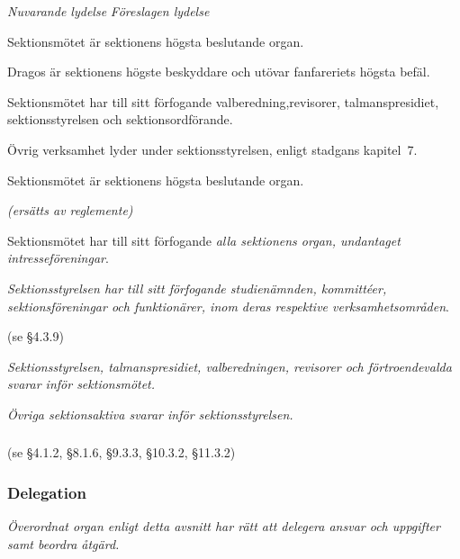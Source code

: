 \documentclass{article}
\newenvironment{lydelse}
    {\begin{paracol}{2}%
        \emph{Nuvarande lydelse}%
        \switchcolumn%
        \emph{Föreslagen lydelse}%
    \end{paracol}%
    \begin{enumerate}[label=\thesubsection.\arabic*]%
    \begin{paracol}{2}%
    }{\end{paracol}\end{enumerate}}
\begin{document}
\begin{lydelse}
	\item Sektionsmötet är sektionens högsta beslutande organ.
    \item Dragos är sektionens högste beskyddare och utövar fanfareriets högsta befäl.
    \item Sektionsmötet har till sitt förfogande valberedning,revisorer, talmanspresidiet, sektionsstyrelsen och sektionsordförande.
    \item Övrig verksamhet lyder under sektionsstyrelsen, enligt stadgans kapitel~7.
    
  \switchcolumn
  \setcounter{enumi}{0}  
    \item Sektionsmötet är sektionens högsta beslutande organ.
      \label{4.1:högststart}
    
    \item[] \emph{(ersätts av reglemente)}

    \item Sektionsmötet har till sitt förfogande \emph{alla sektionens organ, undantaget intresseföreningar}.
    
    \item \emph{Sektionsstyrelsen har till sitt förfogande studienämnden, kommittéer, sektionsföreningar och funktionärer, inom deras respektive verksamhetsområden}.
      \label{4.1:högstend}
	
  \switchcolumn*
    (se \S 4.3.9)
    
  \switchcolumn
   \item \emph{Sektionsstyrelsen, talmanspresidiet, valberedningen, revisorer och förtroendevalda svarar inför sektionsmötet.} \label{4.2:ansvar1}
   \item \emph{Övriga sektionsaktiva svarar inför sektionsstyrelsen.}
      \label{4.2:ansvar2}

  \switchcolumn*
    \subsubsection*{}
    \item[] (se \S 4.1.2, \S 8.1.6, \S 9.3.3, \S 10.3.2, \S 11.3.2)

  \switchcolumn
    \subsubsection*{Delegation} 
    \item \emph{Överordnat organ enligt detta avsnitt har rätt att delegera ansvar och uppgifter samt beordra åtgärd.} 
      \label{4.x:delegation}
  
\end{lydelse}
\end{document}
